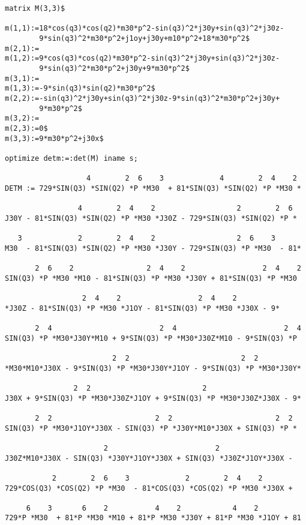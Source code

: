 {\small
\begin{verbatim}
matrix M(3,3)$

m(1,1):=18*cos(q3)*cos(q2)*m30*p^2-sin(q3)^2*j30y+sin(q3)^2*j30z-
        9*sin(q3)^2*m30*p^2+j1oy+j30y+m10*p^2+18*m30*p^2$
m(2,1):=
m(1,2):=9*cos(q3)*cos(q2)*m30*p^2-sin(q3)^2*j30y+sin(q3)^2*j30z-
        9*sin(q3)^2*m30*p^2+j30y+9*m30*p^2$
m(3,1):=
m(1,3):=-9*sin(q3)*sin(q2)*m30*p^2$
m(2,2):=-sin(q3)^2*j30y+sin(q3)^2*j30z-9*sin(q3)^2*m30*p^2+j30y+
        9*m30*p^2$
m(3,2):=
m(2,3):=0$
m(3,3):=9*m30*p^2+j30x$

optimize detm:=:det(M) iname s;

                   4        2  6    3             4        2  4    2
DETM := 729*SIN(Q3) *SIN(Q2) *P *M30  + 81*SIN(Q3) *SIN(Q2) *P *M30 *

                 4        2  4    2                   2        2  6
J30Y - 81*SIN(Q3) *SIN(Q2) *P *M30 *J30Z - 729*SIN(Q3) *SIN(Q2) *P *

   3             2        2  4    2                   2  6    3
M30  - 81*SIN(Q3) *SIN(Q2) *P *M30 *J30Y - 729*SIN(Q3) *P *M30  - 81*

       2  6    2                 2  4    2                  2  4    2
SIN(Q3) *P *M30 *M10 - 81*SIN(Q3) *P *M30 *J30Y + 81*SIN(Q3) *P *M30

                  2  4    2                  2  4    2
*J30Z - 81*SIN(Q3) *P *M30 *J1OY - 81*SIN(Q3) *P *M30 *J30X - 9*

       2  4                         2  4                         2  4
SIN(Q3) *P *M30*J30Y*M10 + 9*SIN(Q3) *P *M30*J30Z*M10 - 9*SIN(Q3) *P

                         2  2                          2  2
*M30*M10*J30X - 9*SIN(Q3) *P *M30*J30Y*J1OY - 9*SIN(Q3) *P *M30*J30Y*

                2  2                          2
J30X + 9*SIN(Q3) *P *M30*J30Z*J1OY + 9*SIN(Q3) *P *M30*J30Z*J30X - 9*

       2  2                        2  2                        2  2
SIN(Q3) *P *M30*J1OY*J30X - SIN(Q3) *P *J30Y*M10*J30X + SIN(Q3) *P *

                       2                         2
J30Z*M10*J30X - SIN(Q3) *J30Y*J1OY*J30X + SIN(Q3) *J30Z*J1OY*J30X - 

           2        2  6    3             2        2  4    2
729*COS(Q3) *COS(Q2) *P *M30  - 81*COS(Q3) *COS(Q2) *P *M30 *J30X + 

     6    3       6    2           4    2            4    2
729*P *M30  + 81*P *M30 *M10 + 81*P *M30 *J30Y + 81*P *M30 *J1OY + 81


\end{verbatim}}
